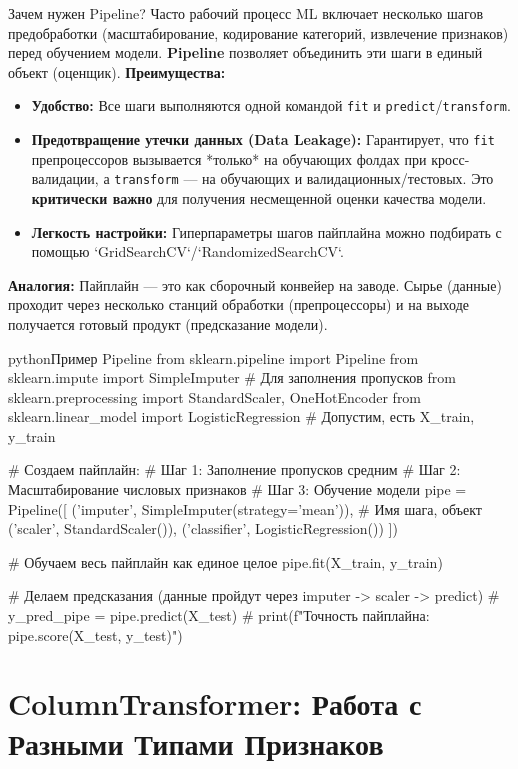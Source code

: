 \begin{myblock}{Зачем нужен Pipeline?}
    Часто рабочий процесс ML включает несколько шагов предобработки (масштабирование, кодирование категорий, извлечение признаков) перед обучением модели. \textbf{Pipeline} позволяет объединить эти шаги в единый объект (оценщик).
    \textbf{Преимущества:}
    \begin{itemize}
        \item \textbf{Удобство:} Все шаги выполняются одной командой \texttt{fit} и \texttt{predict}/\texttt{transform}.
        \item \textbf{Предотвращение утечки данных (Data Leakage):} Гарантирует, что \texttt{fit} препроцессоров вызывается *только* на обучающих фолдах при кросс-валидации, а \texttt{transform} — на обучающих и валидационных/тестовых. Это \textbf{критически важно} для получения несмещенной оценки качества модели. %
        \item \textbf{Легкость настройки:} Гиперпараметры шагов пайплайна можно подбирать с помощью `GridSearchCV`/`RandomizedSearchCV`.
    \end{itemize}
    \textbf{Аналогия:} Пайплайн — это как сборочный конвейер на заводе. Сырье (данные) проходит через несколько станций обработки (препроцессоры) и на выходе получается готовый продукт (предсказание модели).
\end{myblock}

\begin{codebox}{python}{Пример Pipeline}
from sklearn.pipeline import Pipeline
from sklearn.impute import SimpleImputer # Для заполнения пропусков
from sklearn.preprocessing import StandardScaler, OneHotEncoder
from sklearn.linear_model import LogisticRegression
# Допустим, есть X_train, y_train

# Создаем пайплайн:
# Шаг 1: Заполнение пропусков средним
# Шаг 2: Масштабирование числовых признаков
# Шаг 3: Обучение модели
pipe = Pipeline([
    ('imputer', SimpleImputer(strategy='mean')), # Имя шага, объект
    ('scaler', StandardScaler()),
    ('classifier', LogisticRegression())
])

# Обучаем весь пайплайн как единое целое
pipe.fit(X_train, y_train)

# Делаем предсказания (данные пройдут через imputer -> scaler -> predict)
# y_pred_pipe = pipe.predict(X_test)
# print(f"Точность пайплайна: {pipe.score(X_test, y_test)}")
\end{codebox}

\section{ColumnTransformer: Работа с Разными Типами Признаков}

